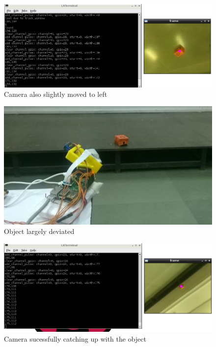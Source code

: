 \documentclass[11pt,a4paper]{article}
\begin{document}
   \begin{figure}[h]
    \includegraphics[scale=0.5]{2.png}
   \centering
 \caption{Camera also slightly moved to left}
  \end{figure}
   \begin{figure}[h]
 \includegraphics[scale=0.5]{s3.jpg}
   \centering
 \caption{Object largely deviated}
  \end{figure}
   \begin{figure}[h]
    \includegraphics[scale=0.5]{3.png}
   \centering
 \caption{Camera sucessfully catching up with the object}
  \end{figure}
	
	
\end{document}

